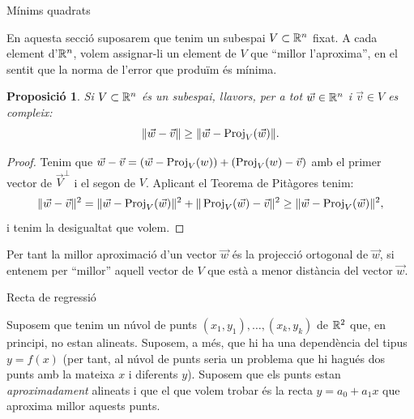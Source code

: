 \documentclass[
  11pt,
]{book}
\makeatletter
\numberwithin{dummy}{section}
\theoremstyle{maincolornumbox}
\theoremstyle{blacknumex}
\theoremstyle{blacknumbox}
\theoremstyle{maincolornum}
\newtheorem{propositionT}{Proposició}[chapter]
\newenvironment{proposition}{\begin{pBox}\begin{propositionT}}{\end{propositionT}\end{pBox}}
\renewcommand{\section}{\@startsection{section}{1}{\z@}
{-4ex \@plus -1ex \@minus -.4ex}
{1ex \@plus.2ex }
{\normalfont\large\sffamily\bfseries}}
\renewcommand{\subsection}{\@startsection {subsection}{2}{\z@}
{-3ex \@plus -0.1ex \@minus -.4ex}
{0.5ex \@plus.2ex }
{\normalfont\sffamily\bfseries}}
\newlength\esp
\makeatother
\begin{document}
\section{Mínims quadrats}\label{muxednims-quadrats}

En aquesta secció suposarem que tenim un subespai \(V\subset\mathbb{R}^n\) fixat.
A cada element d'\(\mathbb{R}^n\), volem assignar-li un element de \(V\) que ``millor
l'aproxima'', en el sentit que la norma de l'error que produïm és mínima.

\begin{proposition}
\protect\hypertarget{prp:proj-com-aprox}{}\label{prp:proj-com-aprox}Si \(V \subset \mathbb{R}^n\)
és un subespai, llavors, per a tot \(\vec w \in \mathbb{R}^n\) i \(\vec v\in V\) es
compleix: \[\|\vec w - \vec v\| \geq \|\vec w - \operatorname{Proj}_V(\vec w)\|.\]
\end{proposition}

\begin{proof}
Tenim que
\(\vec w - \vec v = (\vec w - \operatorname{Proj}_V(w)) + (\operatorname{Proj}_V(w) - \vec v)\) amb el
primer vector de \(\vec V^\perp\) i el segon de \(V\). Aplicant el Teorema
de Pitàgores tenim:
\[\|\vec w - \vec v\|^2= \|\vec w - \operatorname{Proj}_V(\vec w)\|^2 + \|\operatorname{Proj}_V(\vec w) - \vec v\|^2 \geq \|\vec w - \operatorname{Proj}_V(\vec w)\|^2 ,\]
i tenim la desigualtat que volem.
\end{proof}

Per tant la millor aproximació d'un vector \(\vec w\) és la projecció
ortogonal de \(\vec w\), si entenem per ``millor'' aquell vector de \(V\) que
està a menor distància del vector \(\vec w\).

\subsection{Recta de regressió}\label{recta-de-regressiuxf3}

Suposem que tenim un núvol de punts \((x_1,y_1), \dots , (x_k,y_k)\) de
\(\mathbb{R}^2\) que, en principi, no estan alineats. Suposem, a més, que hi ha
una dependència del tipus \(y=f(x)\) (per tant, al núvol de punts seria un
problema que hi hagués dos punts amb la mateixa \(x\) i diferents \(y\)).
Suposem que els punts estan \emph{aproximadament} alineats i que el que volem
trobar és la recta \(y=a_0+a_1x\) que aproxima millor aquests punts.
\end{document}
